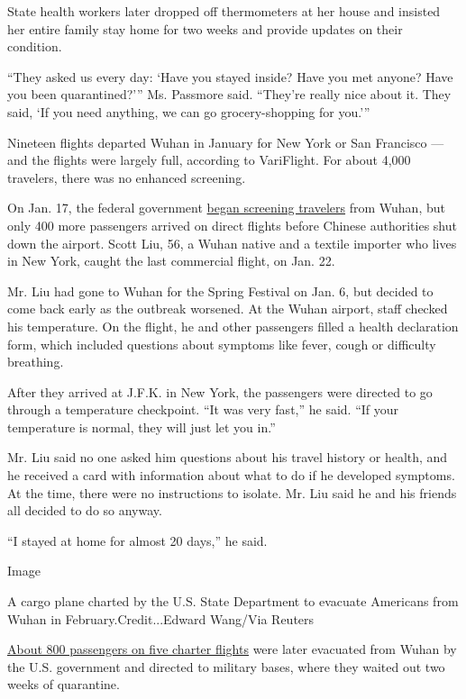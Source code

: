 State health workers later dropped off thermometers at her house and
insisted her entire family stay home for two weeks and provide updates
on their condition.

``They asked us every day: `Have you stayed inside? Have you met anyone?
Have you been quarantined?''' Ms. Passmore said. ``They're really nice
about it. They said, `If you need anything, we can go grocery-shopping
for you.'''

Nineteen flights departed Wuhan in January for New York or San Francisco
--- and the flights were largely full, according to VariFlight. For
about 4,000 travelers, there was no enhanced screening.

On Jan. 17, the federal government
\href{https://www.cdc.gov/media/releases/2020/p0117-coronavirus-screening.html}{began
screening travelers} from Wuhan, but only 400 more passengers arrived on
direct flights before Chinese authorities shut down the airport. Scott
Liu, 56, a Wuhan native and a textile importer who lives in New York,
caught the last commercial flight, on Jan. 22.

Mr. Liu had gone to Wuhan for the Spring Festival on Jan. 6, but decided
to come back early as the outbreak worsened. At the Wuhan airport, staff
checked his temperature. On the flight, he and other passengers filled a
health declaration form, which included questions about symptoms like
fever, cough or difficulty breathing.

After they arrived at J.F.K. in New York, the passengers were directed
to go through a temperature checkpoint. ``It was very fast,'' he said.
``If your temperature is normal, they will just let you in.''

Mr. Liu said no one asked him questions about his travel history or
health, and he received a card with information about what to do if he
developed symptoms. At the time, there were no instructions to isolate.
Mr. Liu said he and his friends all decided to do so anyway.

``I stayed at home for almost 20 days,'' he said.

Image

A cargo plane charted by the U.S. State Department to evacuate Americans
from Wuhan in February.Credit...Edward Wang/Via Reuters

\href{https://www.state.gov/evacuation-of-americans-from-wuhan-china-2/}{About
800 passengers on five charter flights} were later evacuated from Wuhan
by the U.S. government and directed to military bases, where they waited
out two weeks of quarantine.

